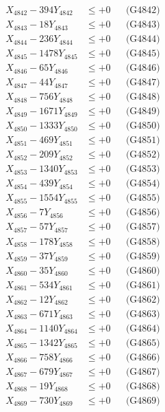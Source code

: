 \documentclass[a4paper,10pt]{article}
\begin{document}
{\begin{align}
X_{4842} - 394Y_{4842} &\leq +0 && \text{(G4842)} \\
X_{4843} - 18Y_{4843} &\leq +0 && \text{(G4843)} \\
X_{4844} - 236Y_{4844} &\leq +0 && \text{(G4844)} \\
X_{4845} - 1478Y_{4845} &\leq +0 && \text{(G4845)} \\
X_{4846} - 65Y_{4846} &\leq +0 && \text{(G4846)} \\
X_{4847} - 44Y_{4847} &\leq +0 && \text{(G4847)} \\
X_{4848} - 756Y_{4848} &\leq +0 && \text{(G4848)} \\
X_{4849} - 1671Y_{4849} &\leq +0 && \text{(G4849)} \\
X_{4850} - 1333Y_{4850} &\leq +0 && \text{(G4850)} \\
\allowbreak
X_{4851} - 469Y_{4851} &\leq +0 && \text{(G4851)} \\
X_{4852} - 209Y_{4852} &\leq +0 && \text{(G4852)} \\
X_{4853} - 1340Y_{4853} &\leq +0 && \text{(G4853)} \\
X_{4854} - 439Y_{4854} &\leq +0 && \text{(G4854)} \\
X_{4855} - 1554Y_{4855} &\leq +0 && \text{(G4855)} \\
X_{4856} - 7Y_{4856} &\leq +0 && \text{(G4856)} \\
X_{4857} - 57Y_{4857} &\leq +0 && \text{(G4857)} \\
X_{4858} - 178Y_{4858} &\leq +0 && \text{(G4858)} \\
X_{4859} - 37Y_{4859} &\leq +0 && \text{(G4859)} \\
X_{4860} - 35Y_{4860} &\leq +0 && \text{(G4860)} \\
\allowbreak
X_{4861} - 534Y_{4861} &\leq +0 && \text{(G4861)} \\
X_{4862} - 12Y_{4862} &\leq +0 && \text{(G4862)} \\
X_{4863} - 671Y_{4863} &\leq +0 && \text{(G4863)} \\
X_{4864} - 1140Y_{4864} &\leq +0 && \text{(G4864)} \\
X_{4865} - 1342Y_{4865} &\leq +0 && \text{(G4865)} \\
X_{4866} - 758Y_{4866} &\leq +0 && \text{(G4866)} \\
X_{4867} - 679Y_{4867} &\leq +0 && \text{(G4867)} \\
X_{4868} - 19Y_{4868} &\leq +0 && \text{(G4868)} \\
X_{4869} - 730Y_{4869} &\leq +0 && \text{(G4869)} \\

\end{align}}
\end{document}

